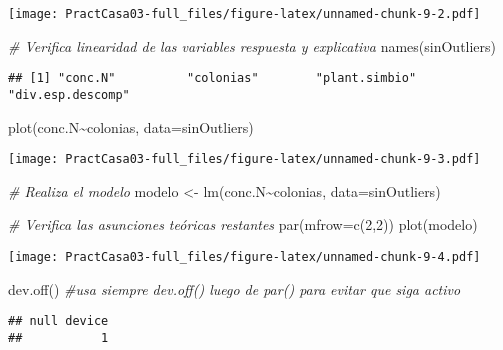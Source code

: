 \documentclass[
]{article}
\newenvironment{Shaded}{}{}
\newcommand{\AttributeTok}[1]{\textcolor[rgb]{0.49,0.56,0.16}{#1}}
\newcommand{\CommentTok}[1]{\textcolor[rgb]{0.38,0.63,0.69}{\textit{#1}}}
\newcommand{\DecValTok}[1]{\textcolor[rgb]{0.25,0.63,0.44}{#1}}
\newcommand{\FunctionTok}[1]{\textcolor[rgb]{0.02,0.16,0.49}{#1}}
\newcommand{\NormalTok}[1]{#1}
\newcommand{\OtherTok}[1]{\textcolor[rgb]{0.00,0.44,0.13}{#1}}
\newcommand{\SpecialCharTok}[1]{\textcolor[rgb]{0.25,0.44,0.63}{#1}}
\begin{document}
\texttt{[image: PractCasa03-full\_files/figure-latex/unnamed-chunk-9-2.pdf]}

\begin{Shaded}
\begin{Highlighting}[]
\CommentTok{\# Verifica linearidad de las variables respuesta y explicativa}
\FunctionTok{names}\NormalTok{(sinOutliers)}
\end{Highlighting}
\end{Shaded}

\begin{verbatim}
## [1] "conc.N"          "colonias"        "plant.simbio"    "div.esp.descomp"
\end{verbatim}

\begin{Shaded}
\begin{Highlighting}[]
\FunctionTok{plot}\NormalTok{(conc.N}\SpecialCharTok{\textasciitilde{}}\NormalTok{colonias, }\AttributeTok{data=}\NormalTok{sinOutliers)}
\end{Highlighting}
\end{Shaded}

\texttt{[image: PractCasa03-full\_files/figure-latex/unnamed-chunk-9-3.pdf]}

\begin{Shaded}
\begin{Highlighting}[]
\CommentTok{\# Realiza el modelo}
\NormalTok{modelo }\OtherTok{\textless{}{-}} \FunctionTok{lm}\NormalTok{(conc.N}\SpecialCharTok{\textasciitilde{}}\NormalTok{colonias, }\AttributeTok{data=}\NormalTok{sinOutliers)}

\CommentTok{\# Verifica las asunciones teóricas restantes}
\FunctionTok{par}\NormalTok{(}\AttributeTok{mfrow=}\FunctionTok{c}\NormalTok{(}\DecValTok{2}\NormalTok{,}\DecValTok{2}\NormalTok{))}
\FunctionTok{plot}\NormalTok{(modelo)}
\end{Highlighting}
\end{Shaded}

\texttt{[image: PractCasa03-full\_files/figure-latex/unnamed-chunk-9-4.pdf]}

\begin{Shaded}
\begin{Highlighting}[]
\FunctionTok{dev.off}\NormalTok{() }\CommentTok{\#usa siempre dev.off() luego de par() para evitar que siga activo}
\end{Highlighting}
\end{Shaded}

\begin{verbatim}
## null device 
##           1
\end{verbatim}
\end{document}
